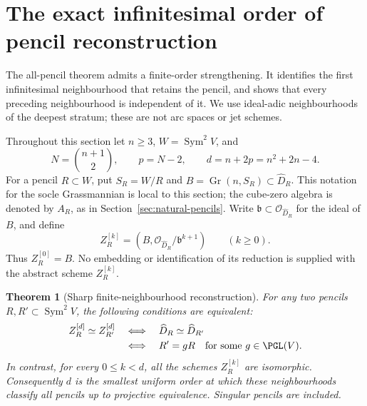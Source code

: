 \documentclass[11pt,reqno]{amsart}
\numberwithin{equation}{section}
\newtheorem{theorem}{Theorem}[section]
\theoremstyle{definition}\newtheorem{definition}[theorem]{Definition}
\theoremstyle{remark}\newtheorem{remark}[theorem]{Remark}
\newcommand{\OO}{\mathcal O}\newcommand{\II}{\mathcal I}
\DeclareMathOperator{\Sym}{Sym}\DeclareMathOperator{\Gr}{Gr}
\begin{document}
\section{The exact infinitesimal order of pencil reconstruction}
\label{sec:finite-neighbourhoods}

The all-pencil theorem admits a finite-order strengthening.  It
identifies the first infinitesimal neighbourhood that retains the
pencil, and shows that every preceding neighbourhood is independent
of it.  We use ideal-adic neighbourhoods of the deepest stratum;
these are not arc spaces or jet schemes.

Throughout this section let \(n\ge3\), \(W=\Sym^2V\), and
\begin{equation}\label{eq:pencil-detection-order}
 N=\binom{n+1}{2},\qquad p=N-2,\qquad
 d=n+2p=n^2+2n-4.
\end{equation}
For a pencil \(R\subset W\), put \(S_R=W/R\) and
\(B=\Gr(n,S_R)\subset\widehat D_R\).  This notation for the
socle Grassmannian is local to this section; the cube-zero algebra
is denoted by \(A_R\), as in Section~\ref{sec:natural-pencils}.
Write \(\mathfrak b\subset\OO_{\widehat D_R}\) for the
ideal of \(B\), and define
\begin{equation}\label{eq:finite-neighbourhood-definition}
 Z_R^{[k]}=(B,\OO_{\widehat D_R}/\mathfrak b^{k+1})
       \qquad(k\ge0).
\end{equation}
Thus \(Z_R^{[0]}=B\).  No embedding or identification of its
reduction is supplied with the abstract scheme \(Z_R^{[k]}\).

\begin{theorem}[Sharp finite-neighbourhood reconstruction]
\label{thm:sharp-finite-pencil}
For any two pencils \(R,R'\subset\Sym^2V\), the following
conditions are equivalent:
\begin{equation}\label{eq:finite-pencil-equivalences}
\begin{split}
 Z_R^{[d]}\simeq Z_{R'}^{[d]}
 &\quad\Longleftrightarrow\quad
 \widehat D_R\simeq\widehat D_{R'}\\
 &\quad\Longleftrightarrow\quad
 R'=gR\quad\text{for some }g\in\PGL(V).
\end{split}
\end{equation}
In contrast, for every \(0\le k<d\), all the schemes
\(Z_R^{[k]}\) are isomorphic.  Consequently \(d\) is the
smallest uniform order at which these neighbourhoods classify all
pencils up to projective equivalence.  Singular pencils are included.
\end{theorem}
\end{document}

